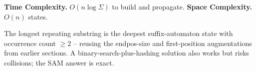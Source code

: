 \begin{complexitybox}
\textbf{Time Complexity.} $O(n\log\Sigma)$ to build and propagate.
\textbf{Space Complexity.} $O(n)$ states.
\end{complexitybox}

\begin{takeawaybox}
The longest repeating substring is the deepest suffix-automaton state with
occurrence count $\ge2$ -- reusing the endpos-size and first-position
augmentations from earlier sections. A binary-search-plus-hashing solution
also works but risks collisions; the SAM answer is exact.
\end{takeawaybox}
